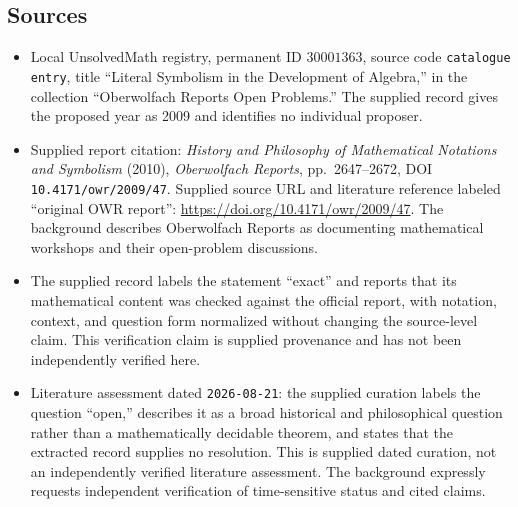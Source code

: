 \documentclass[11pt]{article}
\begin{document}
\subsection{Sources}
\begin{itemize}
\item Local UnsolvedMath registry, permanent ID \(30001363\), source code \texttt{catalogue entry}, title ``Literal Symbolism in the Development of Algebra,'' in the collection ``Oberwolfach Reports Open Problems.'' The supplied record gives the proposed year as 2009 and identifies no individual proposer.
\item Supplied report citation: \emph{History and Philosophy of Mathematical Notations and Symbolism} (2010), \emph{Oberwolfach Reports}, pp.\ 2647--2672, DOI \texttt{10.4171/owr/2009/47}. Supplied source URL and literature reference labeled ``original OWR report'': \url{https://doi.org/10.4171/owr/2009/47}. The background describes Oberwolfach Reports as documenting mathematical workshops and their open-problem discussions.
\item The supplied record labels the statement ``exact'' and reports that its mathematical content was checked against the official report, with notation, context, and question form normalized without changing the source-level claim. This verification claim is supplied provenance and has not been independently verified here.
\item Literature assessment dated \texttt{2026-08-21}: the supplied curation labels the question ``open,'' describes it as a broad historical and philosophical question rather than a mathematically decidable theorem, and states that the extracted record supplies no resolution. This is supplied dated curation, not an independently verified literature assessment. The background expressly requests independent verification of time-sensitive status and cited claims.
\end{itemize}
\end{document}

